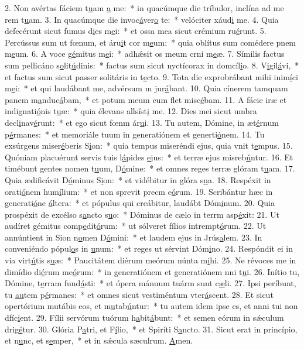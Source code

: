 2. Non avértas fáciem t\uline{u}am \uline{a} me:~* in quacúmque die tríbulor, inclína ad me rem t\uline{u}am.
3. In quacúmque die invoc\uline{á}ver\uline{o} te:~* velóciter xáud\uline{i} me.
4. Quia defecérunt sicut fumus d\uline{i}es m\uline{e}i:~* et ossa mea sicut crémium ru\uline{é}runt.
5. Percússus sum ut fœnum, et áru\uline{i}t cor m\uline{e}um:~* quia oblítus sum comédere pnem m\uline{e}um.
6. A voce g\uline{é}mitus m\uline{e}i:~* adhǽsit os meum crni m\uline{e}æ.
7. Símilis factus sum pellicáno s\uline{o}lit\uline{ú}dinis:~* factus sum sicut nyctícorax in domcíl\uline{i}o.
8. V\uline{i}gil\uline{á}vi,~* et factus sum sicut passer solitáris in t\uline{e}cto.
9. Tota die exprobrábant mihi inim\uline{í}ci m\uline{e}i:~* et qui laudábant me, advérsum m jur\uline{á}bant.
10. Quia cínerem tamquam panem m\uline{a}nduc\uline{á}bam,~* et potum meum cum flet misc\uline{é}bam.
11. A fácie iræ et indignati\uline{ó}nis t\uline{u}æ:~* quia élevans allsíst\uline{i} me.
12. Dies mei sicut umbra decl\uline{i}nav\uline{é}runt:~* et ego sicut fœnm ár\uline{u}i.
13. Tu autem, Dómine, in æt\uline{é}rnum p\uline{é}rmanes:~* et memoriále tuum in generatiónem et generti\uline{ó}nem.
14. Tu exsúrgens miser\uline{é}beris S\uline{i}on:~* quia tempus miseréndi ejus, quia vnit t\uline{e}mpus.
15. Quóniam placuérunt servis tuis l\uline{á}pides \uline{e}jus:~* et terræ ejus misreb\uline{ú}ntur.
16. Et timébunt gentes nomen t\uline{u}um, D\uline{ó}mine:~* et omnes reges terræ glóram t\uline{u}am.
17. Quia ædificávit D\uline{ó}minus S\uline{i}on:~* et vidébitur in glóra s\uline{u}a.
18. Respéxit in orati\uline{ó}nem hum\uline{í}lium:~* et non sprevit precm e\uline{ó}rum.
19. Scribántur hæc in generati\uline{ó}ne \uline{á}ltera:~* et pópulus qui creábitur, laudábt Dóm\uline{i}num.
20. Quia prospéxit de excélso s\uline{a}ncto s\uline{u}o:~* Dóminus de cælo in terrm asp\uline{é}xit:
21. Ut audíret gémitus comp\uline{e}dit\uline{ó}rum:~* ut sólveret fílios intrempt\uline{ó}rum.
22. Ut annúntient in Sion n\uline{o}men D\uline{ó}mini:~* et laudem ejus in Jrús\uline{a}lem.
23. In conveniéndo pópul\uline{o}s in \uline{u}num:~* et reges ut sérvint Dóm\uline{i}no.
24. Respóndit ei in via virt\uline{ú}tis s\uline{u}æ:~* Paucitátem diérum meórum núnta m\uline{i}hi.
25. Ne révoces me in dimídio di\uline{é}rum me\uline{ó}rum:~* in generatiónem et generatiónem nni t\uline{u}i.
26. Inítio tu, Dómine, t\uline{e}rram fund\uline{á}sti:~* et ópera mánuum tuárm sunt c\uline{æ}li.
27. Ipsi períbunt, tu \uline{au}tem p\uline{é}rmanes:~* et omnes sicut vestiméntum vter\uline{á}scent.
28. Et sicut opertórium mutábis eos, et m\uline{u}tab\uline{ú}ntur:~* tu autem idem ipse es, et anni tui non dfíc\uline{i}ent.
29. Fílii servórum tuórum h\uline{a}bit\uline{á}bunt:~* et semen eórum in sǽculum drig\uline{é}tur.
30. Glória P\uline{a}tri, et F\uline{í}lio,~* et Spiríti S\uline{a}ncto.
31. Sicut erat in princípio, et n\uline{u}nc, et s\uline{e}mper,~* et in sǽcula sæculrum. \uline{A}men.
